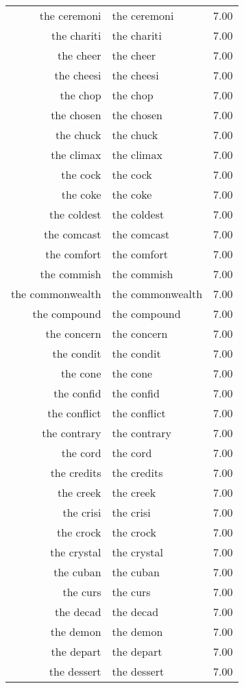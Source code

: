 \begin{table}[ht]
\begin{tabular}{rlr}
  the ceremoni & the ceremoni & 7.00 \\ 
  the chariti & the chariti & 7.00 \\ 
  the cheer & the cheer & 7.00 \\ 
  the cheesi & the cheesi & 7.00 \\ 
  the chop & the chop & 7.00 \\ 
  the chosen & the chosen & 7.00 \\ 
  the chuck & the chuck & 7.00 \\ 
  the climax & the climax & 7.00 \\ 
  the cock & the cock & 7.00 \\ 
  the coke & the coke & 7.00 \\ 
  the coldest & the coldest & 7.00 \\ 
  the comcast & the comcast & 7.00 \\ 
  the comfort & the comfort & 7.00 \\ 
  the commish & the commish & 7.00 \\ 
  the commonwealth & the commonwealth & 7.00 \\ 
  the compound & the compound & 7.00 \\ 
  the concern & the concern & 7.00 \\ 
  the condit & the condit & 7.00 \\ 
  the cone & the cone & 7.00 \\ 
  the confid & the confid & 7.00 \\ 
  the conflict & the conflict & 7.00 \\ 
  the contrary & the contrary & 7.00 \\ 
  the cord & the cord & 7.00 \\ 
  the credits & the credits & 7.00 \\ 
  the creek & the creek & 7.00 \\ 
  the crisi & the crisi & 7.00 \\ 
  the crock & the crock & 7.00 \\ 
  the crystal & the crystal & 7.00 \\ 
  the cuban & the cuban & 7.00 \\ 
  the curs & the curs & 7.00 \\ 
  the decad & the decad & 7.00 \\ 
  the demon & the demon & 7.00 \\ 
  the depart & the depart & 7.00 \\ 
  the dessert & the dessert & 7.00 \\ 

\end{tabular}
\end{table}
